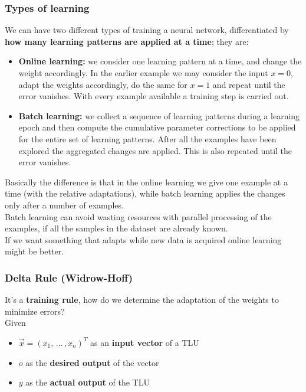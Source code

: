 \documentclass[11pt]{article}
\begin{document}
		\newpage
		
		\subsubsection{Types of learning}
		We can have two different types of training a neural network, differentiated by \textbf{how many learning patterns are applied at a time}; they are:
		\begin{itemize}
			\item \textbf{Online learning:} we consider one learning pattern at a time, and change the weight accordingly. In the earlier example we may consider the input $x=0$, adapt the weights accordingly, do the same for $x=1$ and repeat until the error vanishes. With every example available a training step is carried out.\\
			
			\item \textbf{Batch learning:} we collect a sequence of learning patterns during a learning epoch and then compute the cumulative parameter corrections to be applied for the entire set of learning patterns. After all the examples have been explored the aggregated changes are applied. This is also repeated until the error vanishes.\\
		\end{itemize}
		
		Basically the difference is that in the online learning we give one example at a time (with the relative adaptations), while batch learning applies the changes only after a number of examples.\\
		
		Batch learning can avoid wasting resources with parallel processing of the examples, if all the samples in the dataset are already known. \\
		
		If we want something that adapts while new data is acquired online learning might be better.\\
		
		\newpage
		
		\subsubsection{Delta Rule (Widrow-Hoff)}
		It's a \textbf{training rule}, how do we determine the adaptation of the weights to minimize errors?\\
		
		Given
		\begin{itemize}
			\item $\vec{x} = \left(x_1, \, ... \, , x_n \right)^T$ as an \textbf{input vector} of a TLU
			\item $o$ as the \textbf{desired output} of the vector
			\item $y$ as the \textbf{actual output} of the TLU
		\end{itemize}
		
\end{document}
